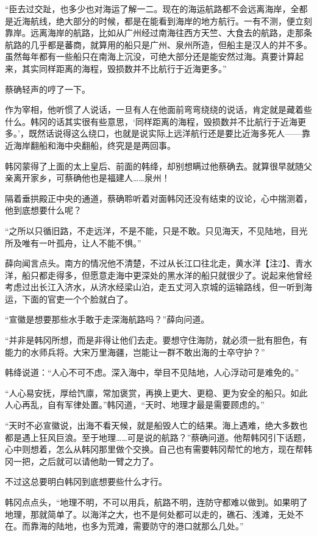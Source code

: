 “臣去过交趾，也多少也对海运了解一二。现在的海运航路都不会远离海岸，全都是近海航线，绝大部分的时候，都是在能看到海岸的地方航行。一有不测，便立刻靠岸。远离海岸的航路，比如从广州经过南海往西方天竺、大食去的航路，走那条航路的几乎都是蕃商，就算用的船只是广州、泉州所造，但船主是汉人的并不多。虽然每年都有一些船只在南海上沉没，可绝大部分还是能安然过海。真要计算起来，其实同样距离的海程，毁损数并不比航行于近海更多。”

蔡确轻声的哼了一下。

作为宰相，他听惯了人说话，一旦有人在他面前弯弯绕绕的说话，肯定就是藏着些什么。韩冈的话其实很有些意思，‘同样距离的海程，毁损数并不比航行于近海更多。’，既然话说得这么绕口，也就是说实际上远洋航行还是要比近海多死人——靠近海岸翻船和海中央翻船，终究是是两回事。

韩冈蒙得了上面的太上皇后、前面的韩绛，却别想瞒过他蔡确去。就算很早就随父亲离开家乡，可蔡确他也是福建人……泉州！

隔着垂拱殿正中央的通道，蔡确聆听着对面韩冈还没有结束的议论，心中揣测着，他到底想要什么呢？

“之所以只循旧路，不走远洋，不是不能，只是不敢。只见海天，不见陆地，目光所及唯有一叶孤舟，让人不能不惧。”

薛向闻言点头。南方的情况他不清楚，不过从长江口往北走，黄水洋【注2】、青水洋，船只都走得多，但愿意走海中更深处的黑水洋的船只就很少了。说起来他曾经考虑过出长江入济水，从济水经梁山泊，走五丈河入京城的运输路线，但一听到海运，下面的官吏一个个脸就白了。

“宣徽是想要那些水手敢于走深海航路吗？”薛向问道。

“并非是韩冈所想，而是非得让他们去走。要想守住海防，就必须一批有胆色，有能力的水师兵将。大宋万里海疆，岂能让一群不敢出海的士卒守护？”

韩绛说道：“人心不可不虑。深入海中，举目不见陆地，人心浮动可是难免的。”

“人心易安抚，厚给饩廪，常加褒赏，再换上更大、更稳、更为安全的船只。如此人心再乱，自有军律处置。”韩冈道，“天时、地理才最是需要顾虑的。”

“天时不必宣徽说，出海不看天候，就是船毁人亡的结果。海上遇难，绝大多数也都是遇上狂风巨浪。至于地理……可是说的航路？”蔡确问道。他帮韩冈引下话题，心中则想着，怎么从韩冈那里做个交换。自己也有需要韩冈帮忙的地方，现在帮韩冈一把，之后就可以请他助一臂之力了。

不过这总要明白韩冈到底想要些什么才行。

韩冈点点头，“地理不明，不可以用兵，航路不明，连防守都难以做到。如果明了地理，那就简单了。以海洋之大，也不是何处都可以走的，礁石、浅滩，无处不在。而靠海的陆地，也多为荒滩，需要防守的港口就那么几处。”


